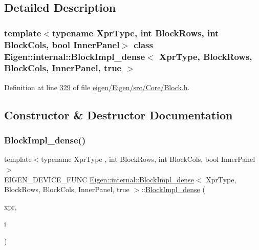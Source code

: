 \subsection{Detailed Description}
\subsubsection*{template$<$typename Xpr\+Type, int Block\+Rows, int Block\+Cols, bool Inner\+Panel$>$\newline
class Eigen\+::internal\+::\+Block\+Impl\+\_\+dense$<$ Xpr\+Type, Block\+Rows, Block\+Cols, Inner\+Panel, true $>$}



Definition at line \hyperlink{eigen_2_eigen_2src_2_core_2_block_8h_source_l00329}{329} of file \hyperlink{eigen_2_eigen_2src_2_core_2_block_8h_source}{eigen/\+Eigen/src/\+Core/\+Block.\+h}.



\subsection{Constructor \& Destructor Documentation}
\mbox{\label{class_eigen_1_1internal_1_1_block_impl__dense_3_01_xpr_type_00_01_block_rows_00_01_block_cols_00_01_inner_panel_00_01true_01_4_a72b340bbcd3acefc375e7a5eacd790f5}} 
\subsubsection{\texorpdfstring{Block\+Impl\+\_\+dense()}{BlockImpl\_dense()}\hspace{0.1cm}{\footnotesize\ttfamily [1/6]}}
{\footnotesize\ttfamily template$<$typename Xpr\+Type , int Block\+Rows, int Block\+Cols, bool Inner\+Panel$>$ \\
E\+I\+G\+E\+N\+\_\+\+D\+E\+V\+I\+C\+E\+\_\+\+F\+U\+NC \hyperlink{class_eigen_1_1internal_1_1_block_impl__dense}{Eigen\+::internal\+::\+Block\+Impl\+\_\+dense}$<$ Xpr\+Type, Block\+Rows, Block\+Cols, Inner\+Panel, true $>$\+::\hyperlink{class_eigen_1_1internal_1_1_block_impl__dense}{Block\+Impl\+\_\+dense} (\begin{DoxyParamCaption}\item[{Xpr\+Type \&}]{xpr,  }\item[{\hyperlink{namespace_eigen_a62e77e0933482dafde8fe197d9a2cfde}{Index}}]{i }\end{DoxyParamCaption})\hspace{0.3cm}{\ttfamily [inline]}}

